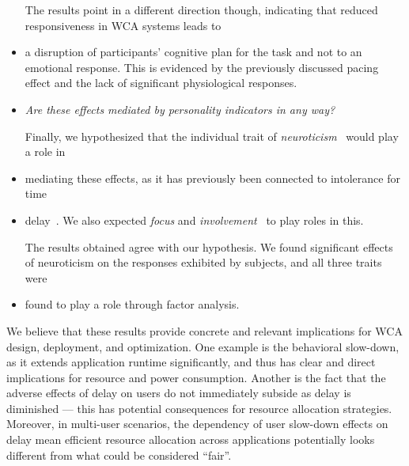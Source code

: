\begin{itemize}
    The results point in a different direction though, indicating that reduced responsiveness in WCA systems leads to
    \item a disruption of participants' cognitive plan for the task and not to an emotional response.
    This is evidenced by the previously discussed pacing effect and the lack of significant physiological responses.

    \item \emph{Are these effects mediated by personality indicators in any way?}

    Finally, we hypothesized that the individual trait of \emph{neuroticism}~\cite{john1999:bfi} would play a role in
    \item mediating these effects, as it has previously been connected to intolerance for time
    \item delay~\cite{hirsh2008delay}.
    We also expected \emph{focus} and \emph{involvement}~\cite{witmer1998:itq} to play roles in this.

    The results obtained agree with our hypothesis.
    We found significant effects of neuroticism on the responses exhibited by subjects, and all three traits were
    \item found to play a role through factor analysis.

\end{itemize}


We believe that these results provide concrete and relevant implications for WCA design, deployment, and optimization.
One example is the behavioral slow-down, as it extends application runtime significantly, and thus has clear and
direct implications for resource and power consumption.
Another is the fact that the adverse effects of delay on users do not immediately subside as delay is diminished ---
this has potential consequences for resource allocation strategies.
Moreover, in multi-user scenarios, the dependency of user slow-down effects on delay mean efficient resource
allocation across applications potentially looks different from what could be considered ``fair''.


